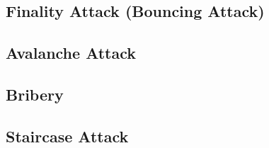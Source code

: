\subsection{Finality Attack (Bouncing Attack)}\label{subsec:finality-attack-(bouncing-attack)}

\subsection{Avalanche Attack}\label{subsec:avalanche-attack}

\subsection{Bribery}\label{subsec:bribery}

\subsection{Staircase Attack}\label{subsec:staircase-attack}